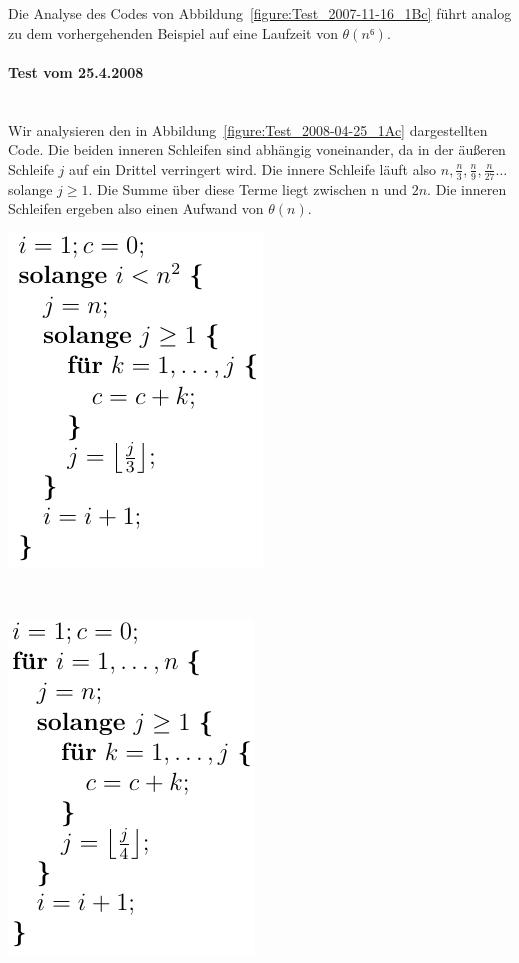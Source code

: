 \documentclass[a4paper, 12pt]{article}
\begin{document}
Die Analyse des Codes von Abbildung~\ref{figure:Test_2007-11-16_1Bc} führt
analog zu dem vorhergehenden Beispiel auf eine Laufzeit von
$θ\left(n⁶\right)$.

\paragraph{Test vom 25.4.2008}~\\

Wir analysieren den in Abbildung~\ref{figure:Test_2008-04-25_1Ac}
dargestellten Code. Die beiden inneren Schleifen sind abhängig voneinander, da
in der äußeren Schleife $j$ auf ein Drittel verringert wird. Die innere
Schleife läuft also $n,\frac{n}{3},\frac{n}{9},\frac{n}{27}\dots$ solange
$j≥1$. Die Summe über diese Terme liegt zwischen n und $2n$. Die inneren
Schleifen ergeben also einen Aufwand von $θ\left(n\right)$.

\begin{minipage}[t]{0.45\textwidth}
    \centering
    \includegraphics{Figures/Test_2008-04-25_1Ac}
    \label{figure:Test_2008-04-25_1Ac}
\end{minipage}
\begin{minipage}[t]{0.08\textwidth}~\end{minipage}
\begin{minipage}[t]{0.45\textwidth}
    \centering
    \includegraphics{Figures/Test_2008-04-25_1Bc}
    \label{figure:Test_2008-04-25_1Bc}
\end{minipage}~\\
\end{document}
